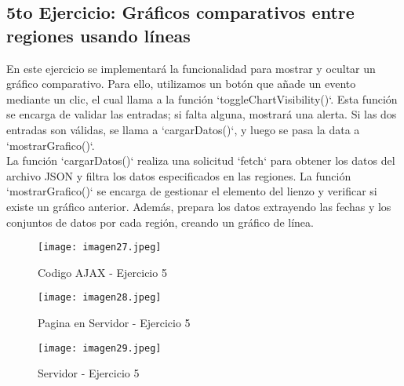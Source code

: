 \documentclass[10pt, a4paper]{article}
\begin{document}
	\subsection*{5to Ejercicio: Gráficos comparativos entre regiones usando líneas} 
	\begin{flushleft}
		En este ejercicio se implementará la funcionalidad para mostrar y ocultar un gráfico comparativo. Para ello, utilizamos un botón que añade un evento mediante un clic, el cual llama a la función `toggleChartVisibility()`. Esta función se encarga de validar las entradas; si falta alguna, mostrará una alerta. Si las dos entradas son válidas, se llama a `cargarDatos()`, y luego se pasa la data a `mostrarGrafico()`. \\
		La función `cargarDatos()` realiza una solicitud `fetch` para obtener los datos del archivo JSON y filtra los datos especificados en las regiones. La función `mostrarGrafico()` se encarga de gestionar el elemento del lienzo y verificar si existe un gráfico anterior. Además, prepara los datos extrayendo las fechas y los conjuntos de datos por cada región, creando un gráfico de línea.
	\end{flushleft}
	\begin{figure}[h]
		\centering
		\texttt{[image: imagen27.jpeg]}
		\caption{Codigo AJAX - Ejercicio 5}
	\end{figure}
	\begin{figure}[h]
		\centering
		\texttt{[image: imagen28.jpeg]}
		\caption{Pagina en Servidor - Ejercicio 5}
	\end{figure}
	\begin{figure}[h]
		\centering
		\texttt{[image: imagen29.jpeg]}
		\caption{Servidor - Ejercicio 5}
	\end{figure}
	\vspace*{8cm}
\end{document}
